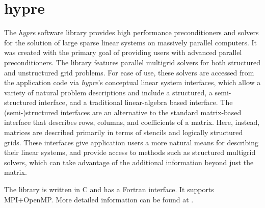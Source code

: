 \section{hypre}


The {\sl hypre} software library provides high performance preconditioners and solvers for the solution of large sparse linear systems on massively parallel computers. It was created with the primary goal of providing users with advanced parallel preconditioners.
The library features parallel multigrid solvers for both structured and unstructured grid problems. 
For ease of use, these solvers are accessed from the application code via {\sl hypre}'s conceptual linear system interfaces, which allow a variety of natural problem descriptions and include a structured, a semi-structured interface, and a traditional linear-algebra based interface. The (semi-)structured interfaces are an alternative to the standard matrix-based interface that describes rows, columns, and coefficients of a matrix. Here, instead, matrices are described primarily in terms of stencils and logically structured grids. These interfaces give application users a more natural means for describing their linear systems, and provide access to methods such as structured multigrid solvers, which can take advantage of the additional information beyond just the matrix. 

The library is written in C and has a Fortran interface. It supports MPI+OpenMP.
More detailed information can be found at \cite{hypre_webpage, hypre_usr_manual}.
